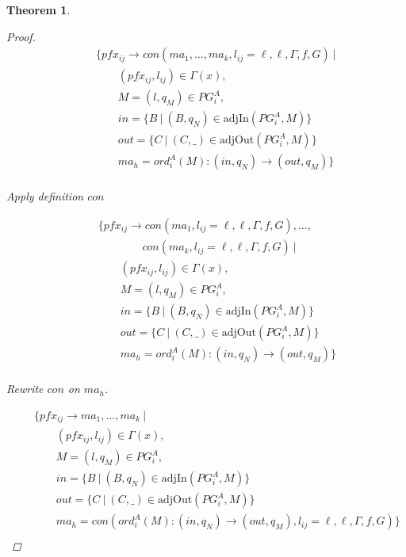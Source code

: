 \documentclass[twocolumn, openany]{sig-alternate-10pt}
\newtheorem{thm}{Theorem}
\begin{document}
\begin{thm}
\begin{proof}
  \[ \begin{array}{l}
     ~~~~~~~~~ \{ pfx_{ij} \rightarrow con(ma_1, \dots, ma_k,l_{ij} = \ell,\ell,\Gamma,f,G) ~\vert~ \\
     ~~~~~~~~~~~~~~~~~~ (pfx_{ij}, l_{ij}) \in \Gamma(x), \\
     ~~~~~~~~~~~~~~~~~~ M = (l,q_M) \in PG^A_i, \\
     ~~~~~~~~~~~~~~~~~~ in = \{ B ~\vert~ (B,q_N) \in \text{adjIn}(PG^A_i,M) \} \\
     ~~~~~~~~~~~~~~~~~~ out = \{ C ~\vert~ (C,\_) \in \text{adjOut}(PG^A_i,M) \} \\
     ~~~~~~~~~~~~~~~~~~ ma_h = ord^A_i(M) : (in,q_N) \rightarrow (out,q_M) \} \\
  \end{array} \]%

  Apply definition $con$

  \[ \begin{array}{l}
     ~~~~~~~~~ \{ pfx_{ij} \rightarrow con(ma_1,l_{ij} = \ell,\ell,\Gamma,f,G), \dots, \\ 
     ~~~~~~~~~~~~~~~~~~~~~~~~~~~ con(ma_k,l_{ij} = \ell,\ell,\Gamma,f,G) ~\vert~ \\
     ~~~~~~~~~~~~~~~~~~ (pfx_{ij}, l_{ij}) \in \Gamma(x), \\
     ~~~~~~~~~~~~~~~~~~ M = (l,q_M) \in PG^A_i, \\
     ~~~~~~~~~~~~~~~~~~ in = \{ B ~\vert~ (B,q_N) \in \text{adjIn}(PG^A_i,M) \} \\
     ~~~~~~~~~~~~~~~~~~ out = \{ C ~\vert~ (C,\_) \in \text{adjOut}(PG^A_i,M) \} \\
     ~~~~~~~~~~~~~~~~~~ ma_h = ord^A_i(M) : (in,q_N) \rightarrow (out,q_M) \} \\
  \end{array} \]%

  Rewrite $con$ on $ma_h$.

  \[ \begin{array}{l}
     ~~~~~~~~~ \{ pfx_{ij} \rightarrow ma_1, \dots, ma_k ~\vert~ \\
     ~~~~~~~~~~~~~~~~~~ (pfx_{ij}, l_{ij}) \in \Gamma(x), \\
     ~~~~~~~~~~~~~~~~~~ M = (l,q_M) \in PG^A_i, \\
     ~~~~~~~~~~~~~~~~~~ in = \{ B ~\vert~ (B,q_N) \in \text{adjIn}(PG^A_i,M) \} \\
     ~~~~~~~~~~~~~~~~~~ out = \{ C ~\vert~ (C,\_) \in \text{adjOut}(PG^A_i,M) \} \\
     ~~~~~~~~~~~~~~~~~~ ma_h = con(ord^A_i(M) : (in,q_N) \rightarrow (out,q_M),l_{ij} = \ell,\ell,\Gamma,f,G) \} \\
  \end{array} \]%


\end{proof}
\end{thm}
\end{document}

